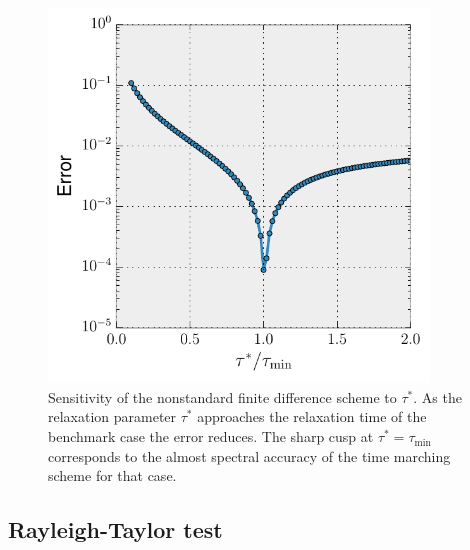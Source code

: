 \documentclass[preprint,12pt,authoryear]{elsarticle}
\begin{document}
\begin{figure}
\includegraphics[width=0.9\textwidth]{figures/tau_sensitivity.pdf}
\caption[Sensitivity of the nonstandard finite difference scheme to $\tau$.]{Sensitivity of the nonstandard finite difference scheme to $\tau^*$. As the relaxation parameter $\tau^*$ approaches the relaxation time of the benchmark case the error reduces. The sharp cusp at $\tau^* = \tau_\mathrm{min}$ corresponds to the almost spectral accuracy of the time marching scheme for that case.}
\label{fig:tau_sensitivity}
\end{figure}

\subsection{Rayleigh-Taylor test}
\label{sec:rayleigh_taylor}
\end{document}
